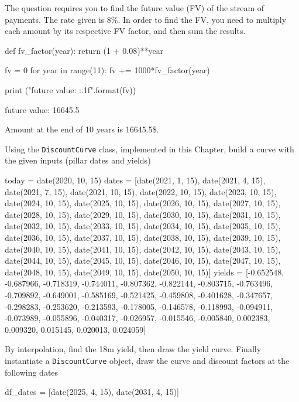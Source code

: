 \cprotEnv\begin{solution}
The question requires you to find the future value (FV) of the stream of payments. The rate given is 8\%.
In order to find the FV, you need to multiply each amount by its respective FV factor, and then sum the results.
	
\begin{ipython}
def fv_factor(year):
	return (1 + 0.08)**year
		
fv = 0
for year in range(11):
	fv += 1000*fv_factor(year)
		
print ("future value: {:.1f}".format(fv))
\end{ipython}
\begin{ioutput}
future value: 16645.5
\end{ioutput}
Amount at the end of 10 years is 16645.5\$.
\end{solution}

\cprotEnv\begin{question}
\label{ex:yield_discount}
Using the \texttt{DiscountCurve} class, implemented in this Chapter, build a curve with the given inputs (pillar dates and yields)

\begin{ipython}
today = date(2020, 10, 15)
dates = [date(2021, 1, 15), date(2021, 4, 15), date(2021, 7, 15),
         date(2021, 10, 15), date(2022, 10, 15), date(2023, 10, 15),
         date(2024, 10, 15), date(2025, 10, 15), date(2026, 10, 15),
         date(2027, 10, 15), date(2028, 10, 15), date(2029, 10, 15),
         date(2030, 10, 15), date(2031, 10, 15), date(2032, 10, 15),
         date(2033, 10, 15), date(2034, 10, 15), date(2035, 10, 15),
         date(2036, 10, 15), date(2037, 10, 15), date(2038, 10, 15),
         date(2039, 10, 15), date(2040, 10, 15), date(2041, 10, 15),
         date(2042, 10, 15), date(2043, 10, 15), date(2044, 10, 15),
         date(2045, 10, 15), date(2046, 10, 15), date(2047, 10, 15),
         date(2048, 10, 15), date(2049, 10, 15), date(2050, 10, 15)]
yields = [-0.652548, -0.687966, -0.718319, -0.744011, -0.807362,
          -0.822144, -0.803715, -0.763496, -0.709892, -0.649001,
          -0.585169, -0.521425, -0.459808, -0.401628, -0.347657,
          -0.298283, -0.253620, -0.213593, -0.178005, -0.146578,
          -0.118993, -0.094911, -0.073989, -0.055896, -0.040317,
          -0.026957, -0.015546, -0.005840,  0.002383,  0.009320,
           0.015145,  0.020013,  0.024059]
\end{ipython}
\noindent
By interpolation, find the 18m yield, then draw the yield curve. Finally instantiate a \texttt{DiscountCurve} object, draw the curve and discount factors at the following dates
\begin{ipython}
df_dates = [date(2025, 4, 15), date(2031, 4, 15)]
\end{ipython}
\end{question}

